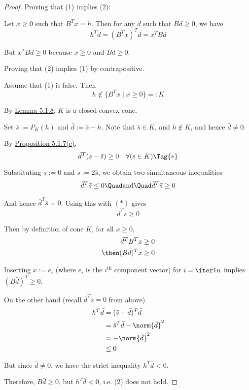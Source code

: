 \begin{proof}
  Proving that (1) implies (2):

  Let $x\geq0$ such that $B^Tx=h$. Then for any $d$ such that $Bd\geq0$, we have
  $$
    h^Td=(B^Tx)^Td=x^TBd
  $$

  But $x^TBd\geq0$ because $x\geq0$ and $Bd\geq0$.

  Proving that (2) implies (1) by contrapositive.

  Assume that (1) is false. Then
  $$
    h\notin\{B^Tx \mid x\geq0\}=:K
  $$

  By \href{d2dff14}{Lemma 5.1.8}, $K$ is a closed convex cone.

  Set $\bar s:=P_K(h)$ and $\bar d:=\bar s-h$. Note that $\bar s\in K$, and
  $h\notin K$, and hence $\bar d\neq0$.

  By \href{ce30ae7}{Proposition 5.1.7(c)},
  \begin{equation*}
    \bar d^T(s-\bar s)\geq0\quad\forall(s\in K)\Tag{*}
  \end{equation*}

  Substituting $s:=0$ and $s:=2\bar s$, we obtain two simultaneous inequalities
  \begin{align*}
    \bar d^T\bar s\leq0\Quad\text{and}\Quad\bar d^T\bar s\geq0
  \end{align*}

  And hence $\bar d^T\bar s=0$. Using this with $(*)$ gives
  $$
    \bar d^Ts\geq0
  $$

  Then by definition of cone $K$, for all $x\geq0$,
  \begin{align*}
    \bar d^T B^Tx     & \geq0 \\
    \then(B\bar d)^Tx & \geq0
  \end{align*}

  Inserting $x:=e_i$ (where $e_i$ is the $i^\text{th}$ component vector) for
  $i=\iter1n$ implies $(B\bar d)^T\geq0$.

  On the other hand (recall $\bar d^T\bar s=0$ from above)
  \begin{align*}
    h^T\bar d & =(\bar s-\bar d)^T\bar d        \\
              & =\bar s^T\bar d-\norm{\bar d}^2 \\
              & =-\norm{\bar d}^2               \\
              & \leq 0
  \end{align*}

  But since $\bar d\neq0$, we have the strict inequality $h^T\bar d<0$.

  Therefore, $B\bar d\geq0$, but $h^T\bar d<0$, i.e. (2) does not hold.
\end{proof}

